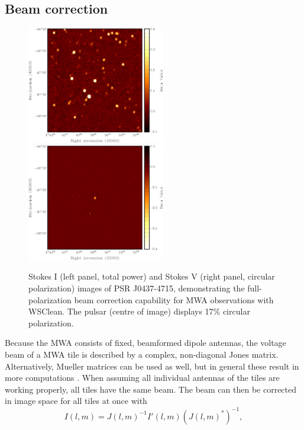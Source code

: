\documentclass[useAMS,usenatbib]{mn2e}
\begin{document}
\subsection{Beam correction}
\begin{figure}
\begin{center}
\includegraphics[width=6cm]{img/pulsar-stokesi}\hspace{1cm}\includegraphics[width=6cm]{img/pulsar-stokesv}
\caption{Stokes I (left panel, total power) and Stokes V (right panel, circular polarization) images of PSR J0437-4715, demonstrating the full-polarization beam correction capability for MWA observations with WSClean. The pulsar (centre of image) displays 17\% circular polarization.}
\label{fig:pulsar-stokes-iv}
\end{center}
\end{figure}
Because the MWA consists of fixed, beamformed dipole antennas, the voltage beam of a MWA tile is described by a complex, non-diagonal Jones matrix. Alternatively, Mueller matrices can be used as well, but in general these result in more computations \citep{revisiting-me-i}. When assuming all individual antennas of the tiles are working properly, all tiles have the same beam. The beam can then be corrected in image space for all tiles at once with
\begin{equation}\label{eq:beam-correction}
 I(l, m) = J(l,m)^{-1} I'(l, m) \left(J(l,m)^*\right)^{-1},
\end{equation}
\end{document}
